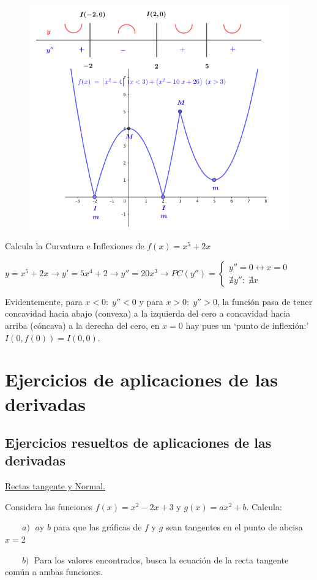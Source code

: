 \begin{ejem}
	\begin{figure}[H]
	\centering
	\includegraphics[width=.7\textwidth]{imagenes/imagenes05/T05IM16.png}
	\end{figure}
			
	\end{ejem}
	
	\begin{ejem}
	Calcula la Curvatura e Inflexiones	de $f(x)=x^5+2x$
	
	$y=x^5+2x \to y'=5x^4+2 \to y''=20x^3 \to PC(y'')=\begin{cases}
	y''=0 \leftrightarrow x=0 \\
	\nexists y'' : \; \nexists x
	\end{cases}$
	
	Evidentemente, para $x<0:\; y''<0$ y para $x>0: \; y''>0$, la función pasa de tener concavidad hacia abajo (convexa) a la izquierda del cero a concavidad hacia arriba (cóncava) a la derecha del cero, en $x=0$ hay pues un `punto de inflexión:' $I(0,f(0))=I(0,0)$.
	\end{ejem}


\section{Ejercicios de aplicaciones de las derivadas}
\subsection{Ejercicios resueltos de aplicaciones de las derivadas}

\underline{Rectas tangente y Normal.}

	\begin{ejre}
			Considera las funciones $f(x)=x^2-2x+3$ y $g(x)=ax^2+b$. Calcula:
			
			$\qquad a) \; $ $a$y $b$ para que las gráficas de $f$ y $g$ sean tangentes en el punto de abcisa $x=2$
			
			$\qquad b) \;$ Para los valores encontrados, busca la ecuación de la recta tangente común a ambas funciones. 
			
	\end{ejre}
		
